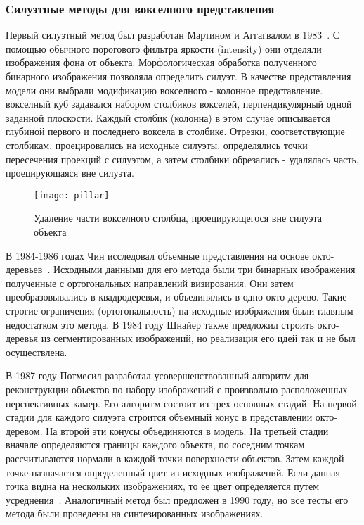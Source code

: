\subsubsection{Силуэтные методы для вокселного представления}
Первый силуэтный метод был разработан Мартином и Аггагвалом в 1983~\cite{aggarwal}. С помощью обычного порогового фильтра яркости (intensity) они отделяли изображения фона от объекта. Морфологическая обработка полученного бинарного изображения позволяла определить силуэт. В качестве представления модели они выбрали модификацию вокселного - колонное представление. вокселный куб задавался набором столбиков вокселей, перпендикулярный одной заданной плоскости. Каждый столбик (колонна) в этом случае описывается глубиной первого и последнего воксела в столбике. Отрезки, соответствующие столбикам, проецировались на исходные силуэты, определялись точки пересечения проекций с силуэтом, а затем столбики обрезались - удалялась часть, проецирующаяся вне силуэта.
\begin{figure}[h]
\center
\texttt{[image: pillar]}
\caption{Удаление части вокселного столбца, проецирующегося вне силуэта объекта}
\end{figure}

В 1984-1986 годах Чин исследовал объемные представления на основе окто-деревьев~\cite{chien}. Исходными данными для его метода были три бинарных изображения полученные с ортогональных направлений визирования. Они затем преобразовывались в квадродеревья, и объединялись в одно окто-дерево. Такие строгие ограничения (ортогональность) на исходные изображения были главным недостатком это метода. В 1984 году Шнайер также предложил строить окто-деревья из сегментированных изображений, но реализация его идей так и не был осуществлена.

В 1987 году Потмесил разработал усовершенствованный алгоритм для реконструкции объектов по набору изображений с произвольно расположенных перспективных камер. Его алгоритм состоит из трех основных стадий. На первой стадии для каждого силуэта строится объемный конус в представлении окто-деревом. На второй эти конусы объединяются в модель. На третьей стадии вначале определяются границы каждого объекта, по соседним точкам рассчитываются нормали в каждой точки поверхности объектов. Затем каждой точке назначается определенный цвет из исходных изображений. Если данная точка видна на нескольких изображениях, то ее цвет определяется путем усреднения~\cite{potmesil}. Аналогичный метод был предложен в 1990 году, но все тесты его метода были проведены на синтезированных изображениях.

